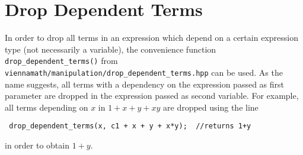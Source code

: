 

 \section{Drop Dependent Terms}
In order to drop all terms in an expression which depend on a certain expression type (not necessarily a variable), the convenience function
\lstinline|drop_dependent_terms()| from \lstinline|viennamath/manipulation/drop_dependent_terms.hpp| can be used. As the name suggests, all terms with a
dependency on the expression passed as first parameter are dropped in the expression passed as second variable.
For example, all terms depending on $x$ in $1+x+y+xy$ are dropped using the line
\begin{lstlisting}
 drop_dependent_terms(x, c1 + x + y + x*y);  //returns 1+y
\end{lstlisting}
in order to obtain $1+y$.





